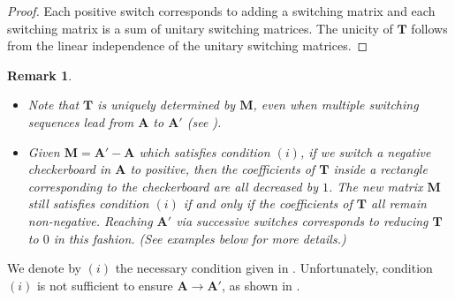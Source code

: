 \documentclass{article}
\newtheorem{remark}{Remark}
\newcommand{\rar}{\rightarrow}
\newcommand{\A}{\mathbf A}
\newcommand{\M}{\mathbf M}
\newcommand{\T}{\mathbf T}
\begin{document}
\begin{proof}
Each positive switch corresponds to adding a switching matrix and each switching matrix is a sum of unitary switching matrices. The unicity of $\T$ follows from the linear independence of the unitary switching matrices.
\end{proof}




\begin{remark}
~

\begin{itemize}
    \item Note that $\T$ is uniquely determined by $\M$, even when multiple switching sequences lead from $\A$ to $\A'$ (see ).
    \item Given $\M=\A'-\A$ which satisfies condition $(i)$, if we switch a negative checkerboard in $\A$ to positive, then the coefficients of $\T$ inside a rectangle corresponding to the checkerboard are all decreased by $1$. The new matrix $\M$ still satisfies condition $(i)$ if and only if the coefficients of $\T$ all remain non-negative. Reaching $\A'$ via successive switches corresponds to reducing $\T$ to $0$ in this fashion. (See examples below for more details.) 
\end{itemize}
\end{remark}

We denote by $(i)$ the necessary condition given in . Unfortunately, condition $(i)$ is not sufficient to ensure $\A\rar\A'$, as shown in .  
\end{document}
